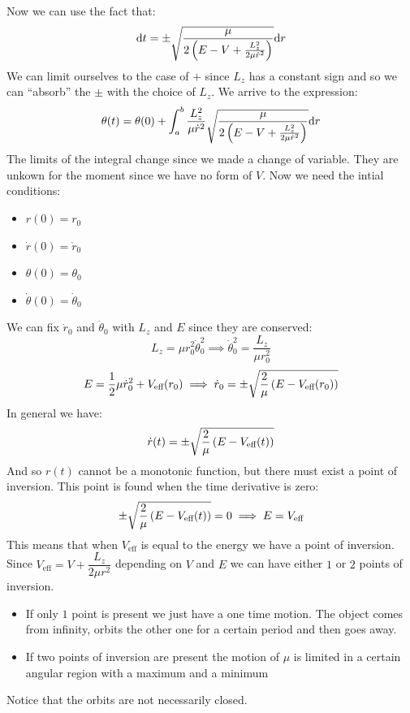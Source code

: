 Now we can use the fact that:
\begin{equation}
  \mathrm{d}t = \pm\sqrt{\dfrac{\mu}{2\left(E - V + \frac{L_z^2}{2\mu \dot{r}^2}\right)}}\mathrm{d}r
\end{equation}
We can limit ourselves to the case of $+$ since $L_z$ has a constant sign and so we can ``absorb'' the $\pm$ with the choice of $L_z$. We arrive to the expression:
\begin{equation}
  \theta(t) = \theta(0) + \int_{a}^{b}\dfrac{L_z^2}{\mu \dot{r}^2}\sqrt{\dfrac{\mu}{2\left(E - V + \frac{L_z^2}{2\mu \dot{r}^2}\right)}}\mathrm{d}r
\end{equation}
The limits of the integral change since we made a change of variable. They are unkown for the moment since we have no form of $V$. Now we need the intial conditions:
\begin{itemize}
  \item $r(0) = r_0$
  \item $\dot{r}(0) = \dot{r}_0$
  \item $\theta(0) = \theta_0$
  \item $\dot{\theta}(0) = \dot{\theta}_0$
\end{itemize}
We can fix $\dot{r}_0$ and $\dot{\theta}_0$ with $L_z$ and $E$ since they are conserved:
\begin{equation}
  L_z = \mu r_0^2 \dot{\theta}_0^2 \implies \dot{\theta}_0^2 = \dfrac{L_z}{\mu r_0^2}
\end{equation}
\begin{equation}
  E = \dfrac{1}{2}\mu\dot{r}_0^2 + V_{\text{eff}}(r_0) \implies \dot{r}_0 = \pm\sqrt{\dfrac{2}{\mu}\left(E - V_{\text{eff}}(r_0)\right)}
\end{equation}
In general we have:
\begin{equation}
    \dot{r}(t) = \pm\sqrt{\dfrac{2}{\mu}\left(E - V_{\text{eff}}(t)\right)}
\end{equation}
And so $r(t)$ cannot be a monotonic function, but there must exist a point of inversion. This point is found when the time derivative is zero:
\begin{equation}
    \pm\sqrt{\dfrac{2}{\mu}\left(E - V_{\text{eff}}(t)\right)} = 0 \implies E = V_{\text{eff}}
\end{equation}
This means that when $V_{\text{eff}}$ is equal to the energy we have a point of inversion. Since $V_{\text{eff}} = V + \dfrac{L_z}{2\mu r^2}$ depending on $V$ and $E$ we can have either $1$ or $2$ points of inversion.
\begin{itemize}
    \item If only $1$ point is present we just have a one time motion. The object comes from infinity, orbits the other one for a certain period and then goes away.
    \item If two points of inversion are present the motion of $\mu$ is limited in a certain angular region with a maximum and a minimum
\end{itemize}
Notice that the orbits are not necessarily closed.
